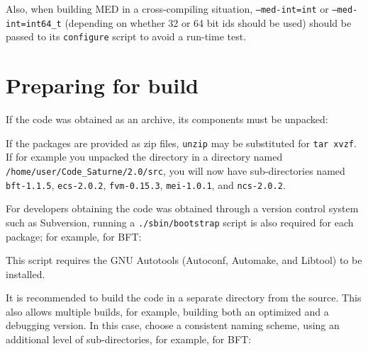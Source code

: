 \documentclass[a4paper,10pt,twoside]{article}
\begin{document}
Also, when building MED in a cross-compiling situation,
\texttt{--med-int=int} or \texttt{--med-int=int64\_t} (depending
on whether 32 or 64 bit ids should be used) should be
passed to its \texttt{configure} script to avoid a run-time
test.

\section{Preparing for build\label{sec:prepare}}

If the code was obtained as an archive, its components must be unpacked:


If the packages are provided as zip files, \texttt{unzip} may be substituted
for \texttt{tar xvzf}.
If for example you unpacked the directory in a directory
named \texttt{/home/user/Code\_Saturne/2.0/src}, you will now
have sub-directories named \texttt{bft-1.1.5}, \texttt{ecs-2.0.2},
\texttt{fvm-0.15.3}, \texttt{mei-1.0.1}, and \texttt{ncs-2.0.2}.

For developers obtaining the code was obtained through a version control
system such as Subversion, running a \texttt{./sbin/bootstrap}
script is also required for each package; for example, for BFT:


This script requires the GNU Autotools (Autoconf, Automake, and Libtool)
to be installed.

It is recommended to build the code in a separate directory from the source.
This also allows multiple builds, for example, building both an
optimized and a debugging version. In this case, choose a consistent
naming scheme, using an additional level of sub-directories,
for example, for BFT:
\end{document}
